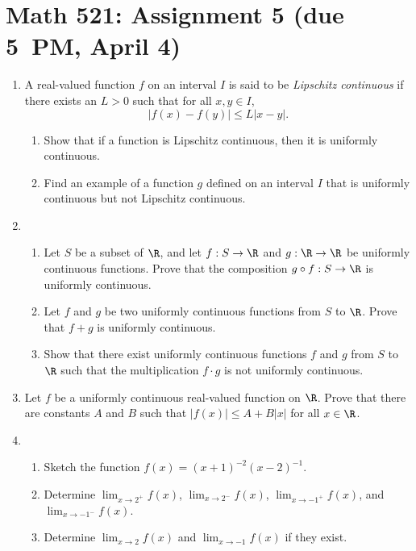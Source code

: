\documentclass[12pt]{article}
\begin{document}
\section*{Math 521: Assignment 5 (due 5~PM, April 4)}
\begin{enumerate}
  \item A real-valued function $f$ on an interval $I$ is said to be
    \textit{Lipschitz continuous} if there exists an $L>0$ such that
    for all $x,y \in I$,
    \begin{equation}
      |f(x)-f(y)| \le L |x-y|.
    \end{equation}
    \begin{enumerate}
      \item Show that if a function is Lipschitz continuous, then it is
        uniformly continuous.
      \item Find an example of a function $g$ defined on an interval $I$
        that is uniformly continuous but not Lipschitz continuous.
    \end{enumerate}

  \item
    \begin{enumerate}
      \item Let $S$ be a subset of $\R$, and let $f:S \to \R$ and $g:\R \to \R$
	be uniformly continuous functions. Prove that the composition $g \circ
	f: S \to \R$ is uniformly continuous.
      \item Let $f$ and $g$ be two uniformly continuous functions from $S$
	to $\R$. Prove that $f+g$ is uniformly continuous.
      \item Show that there exist uniformly continuous functions $f$ and $g$
	from $S$ to $\R$ such that the multiplication $f\cdot g$ is not
	uniformly continuous.
    \end{enumerate}
    
  \item Let $f$ be a uniformly continuous real-valued function on $\R$. Prove
    that there are constants $A$ and $B$ such that $|f(x)|\le A+B|x|$ for all
    $x\in \R$.

  \item
    \begin{enumerate}
      \item Sketch the function $f(x)=(x+1)^{-2} (x-2)^{-1}$.
      \item Determine $\lim_{x\to 2^+} f(x)$, $\lim_{x\to 2^-} f(x)$,
        $\lim_{x\to -1^+} f(x)$, and $\lim_{x \to -1^-} f(x)$.
      \item Determine $\lim_{x\to 2} f(x)$ and $\lim_{x\to-1} f(x)$ if
        they exist.
    \end{enumerate}


\end{enumerate}
\end{document}
